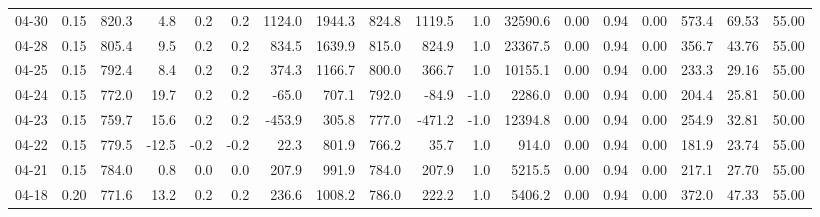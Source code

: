 \begin{threeparttable}
{\begin{tabular}{lrrrrrrrrrrrrrrrrr}
  04-30 &     0.15 & 820.3 &               4.8 &               0.2 &                0.2 &             1124.0 &  1944.3 & 824.8 &     1119.5 &                      1.0 &             32590.6 &       0.00 &      0.94 &           0.00 &            573.4 &           69.53 &                  55.00 \\
  04-28 &     0.15 & 805.4 &               9.5 &               0.2 &                0.2 &              834.5 &  1639.9 & 815.0 &      824.9 &                      1.0 &             23367.5 &       0.00 &      0.94 &           0.00 &            356.7 &           43.76 &                  55.00 \\
  04-25 &     0.15 & 792.4 &               8.4 &               0.2 &                0.2 &              374.3 &  1166.7 & 800.0 &      366.7 &                      1.0 &             10155.1 &       0.00 &      0.94 &           0.00 &            233.3 &           29.16 &                  55.00 \\
  04-24 &     0.15 & 772.0 &              19.7 &               0.2 &                0.2 &              -65.0 &   707.1 & 792.0 &      -84.9 &                     -1.0 &              2286.0 &       0.00 &      0.94 &           0.00 &            204.4 &           25.81 &                  50.00 \\
  04-23 &     0.15 & 759.7 &              15.6 &               0.2 &                0.2 &             -453.9 &   305.8 & 777.0 &     -471.2 &                     -1.0 &             12394.8 &       0.00 &      0.94 &           0.00 &            254.9 &           32.81 &                  50.00 \\
  04-22 &     0.15 & 779.5 &             -12.5 &              -0.2 &               -0.2 &               22.3 &   801.9 & 766.2 &       35.7 &                      1.0 &               914.0 &       0.00 &      0.94 &           0.00 &            181.9 &           23.74 &                  55.00 \\
  04-21 &     0.15 & 784.0 &               0.8 &               0.0 &                0.0 &              207.9 &   991.9 & 784.0 &      207.9 &                      1.0 &              5215.5 &       0.00 &      0.94 &           0.00 &            217.1 &           27.70 &                  55.00 \\
  04-18 &     0.20 & 771.6 &              13.2 &               0.2 &                0.2 &              236.6 &  1008.2 & 786.0 &      222.2 &                      1.0 &              5406.2 &       0.00 &      0.94 &           0.00 &            372.0 &           47.33 &                  55.00 \\

\end{tabular}}
\end{threeparttable}

